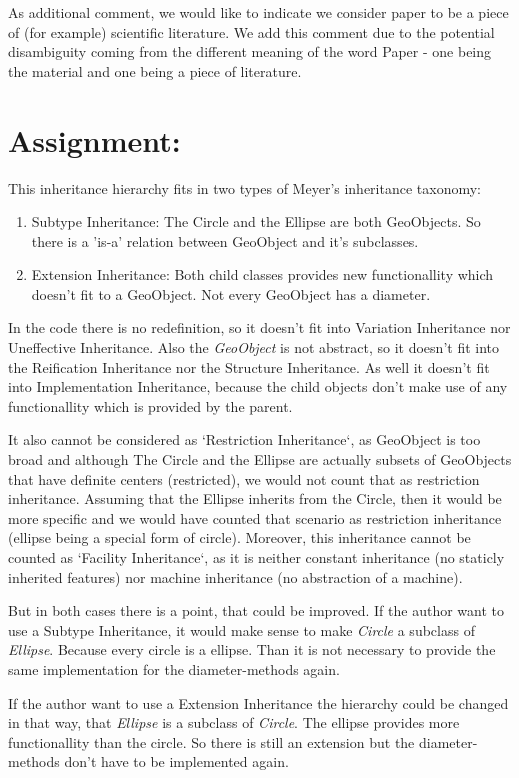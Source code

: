 \documentclass[a4paper,12pt,oneside]{scrreprt}
\begin{document}
    As additional comment, we would like to indicate we consider paper to be a piece of (for example) scientific literature. We add this comment due to the potential disambiguity coming from the different meaning of the word Paper - one being the material and one being a piece of literature. 
    
	\section{Assignment:}
    
    \begin{flushleft}
        This inheritance hierarchy fits in two types of Meyer's inheritance taxonomy:
        \begin{enumerate}
            \item Subtype Inheritance: The Circle and the Ellipse are both GeoObjects. So there is a 'is-a' relation between GeoObject and it's subclasses.
            \item Extension Inheritance: Both child classes provides new functionallity which doesn't fit to a GeoObject. Not every GeoObject has a diameter.
        \end{enumerate}
    
        In the code there is no redefinition, so it doesn't fit into Variation Inheritance nor Uneffective Inheritance. Also the \textit{GeoObject} is not abstract, so it doesn't fit into the Reification Inheritance nor the Structure Inheritance. As well it doesn't fit into Implementation Inheritance, because the child objects don't make use of any functionallity which is provided by the parent.
        
        It also cannot be considered as `Restriction Inheritance`, as GeoObject is too broad and although The Circle and the Ellipse are actually subsets of GeoObjects that have definite centers (restricted), we would not count that as restriction inheritance. Assuming that the Ellipse inherits from the Circle, then it would be more specific and we would have counted that scenario as restriction inheritance (ellipse being a special form of circle). Moreover, this inheritance cannot be counted as `Facility Inheritance`, as it is neither constant inheritance (no staticly inherited features) nor machine inheritance (no abstraction of a machine).
        
        But in both cases there is a point, that could be improved. If the author want to use a Subtype Inheritance, it would make sense to make \textit{Circle} a subclass of \textit{Ellipse}. Because every circle is a ellipse. Than it is not necessary to provide the same implementation for the diameter-methods again.
        
        If the author want to use a Extension Inheritance the hierarchy could be changed in that way, that \textit{Ellipse} is a subclass of \textit{Circle}. The ellipse provides more functionallity than the circle. So there is still an extension but the diameter-methods don't have to be implemented again.
    \end{flushleft}
\end{document}
